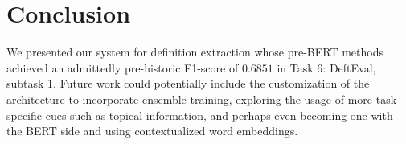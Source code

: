 \documentclass[11pt]{article}
\begin{document}
\section{Conclusion}
We presented our system for definition extraction whose pre-BERT methods achieved an admittedly pre-historic F1-score of $0.6851$ in
Task 6: DeftEval, subtask 1. Future work could potentially include the customization of the architecture to incorporate ensemble training,
exploring the usage of more task-specific cues such as topical information, and perhaps even becoming one with the BERT side and using contextualized word embeddings.

\newpage


\end{document}
